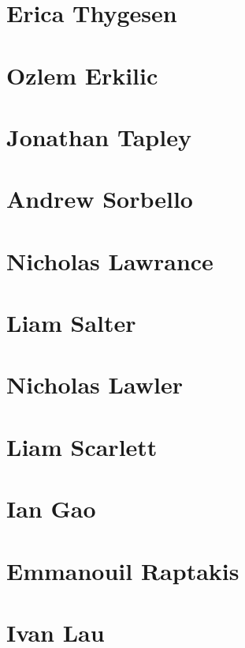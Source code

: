 \chapter{Erica Thygesen}



\chapter{Ozlem Erkilic}


\chapter{Jonathan Tapley}


\chapter{Andrew Sorbello}


\chapter{Nicholas Lawrance}


\chapter{Liam Salter}


\chapter{Nicholas Lawler}


\chapter{Liam Scarlett}


\chapter{Ian Gao}


\chapter{Emmanouil Raptakis}


\chapter{Ivan Lau}




